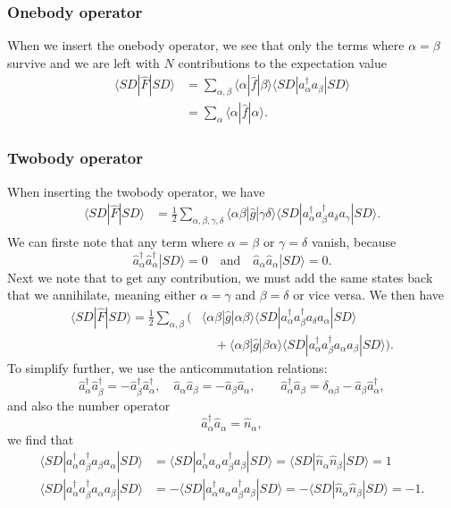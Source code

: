 \documentclass[a4paper, 11pt, notitlepage, english]{article}
\newcommand{\ket}[1]{|#1 \rangle}
\newcommand{\op}[1]{\hat{#1}}
\newcommand{\braopket}[3]{\langle #1 | {#2} | #3 \rangle}
\begin{document}
\subsubsection*{Onebody operator}
When we insert the onebody operator, we see that only the terms where $\alpha=\beta$ survive and we are left with $N$ contributions to the expectation value
\begin{align*}
\braopket{SD}{\op{F}}{SD} 
&= \sum_{\alpha, \beta} \braopket{\alpha}{\op{f}}{\beta}\braopket{SD}{a_\alpha^\dag a_\beta}{SD} \\&= \sum_\alpha \braopket{\alpha}{\op{f}}{\alpha}.		
\end{align*}

\subsubsection*{Twobody operator}
When inserting the twobody operator, we have
\begin{align*}
\braopket{SD}{\op{F}}{SD}
&= \frac{1}{2}\sum_{\alpha, \beta, \gamma, \delta} \braopket{\alpha\beta}{\op{g}}{\gamma\delta}\braopket{SD}{a_\alpha^\dag a_\beta^\dag a_\delta  a_\gamma}{SD}.\\
\end{align*}
We can firste note that any term where $\alpha=\beta$ or $\gamma=\delta$ vanish, because
$$\op{a}_\alpha^\dag \op{a}_\alpha^\dag \ket{SD} = 0 \quad \mbox{and} \quad \op{a}_\alpha \op{a}_\alpha \ket{SD} = 0.$$
Next we note that to get any contribution, we must add the same states back that we annihilate, meaning either $\alpha = \gamma$ and $\beta = \delta$ or vice versa. We then have
\begin{align*}
\braopket{SD}{\op{F}}{SD}
= \frac{1}{2}\sum_{\alpha, \beta}\bigg(
&\braopket{\alpha\beta}{\op{g}}{\alpha\beta}\braopket{SD}{a_\alpha^\dag a_\beta^\dag a_\delta  a_\alpha}{SD} \\[-0.33cm]
&\quad+ \braopket{\alpha\beta}{\op{g}}{\beta\alpha}\braopket{SD}{a_\alpha^\dag a_\beta^\dag a_\alpha  a_\beta}{SD}\bigg).
\end{align*}
To simplify further, we use the anticommutation relations:
$$\op{a}_\alpha^\dag \op{a}_\beta^\dag = -\op{a}_\beta^\dag \op{a}_\alpha^\dag, \quad \op{a}_\alpha \op{a}_\beta = -\op{a}_\beta \op{a}_\alpha, \qquad \op{a}_\alpha^\dag \op{a}_\beta = \delta_{\alpha\beta} - \op{a}_\beta \op{a}_\alpha^\dag,$$
and also the number operator
$$\op{a}_\alpha^\dag \op{a}_\alpha = \op{n}_\alpha,$$
we find that
\begin{align*}
\braopket{SD}{a_\alpha^\dag a_\beta^\dag a_\beta a_\alpha}{SD} &= \braopket{SD}{a_\alpha^\dag a_\alpha a_\beta^\dag a_\beta}{SD} = \braopket{SD}{\op{n}_\alpha \op{n}_\beta}{SD} = 1\\
\braopket{SD}{a_\alpha^\dag a_\beta^\dag a_\alpha  a_\beta}{SD} &= -\braopket{SD}{a_\alpha^\dag  a_\alpha  a_\beta^\dag a_\beta}{SD} = -\braopket{SD}{\op{n}_\alpha \op{n}_\beta}{SD} = -1.
\end{align*}
\end{document}
